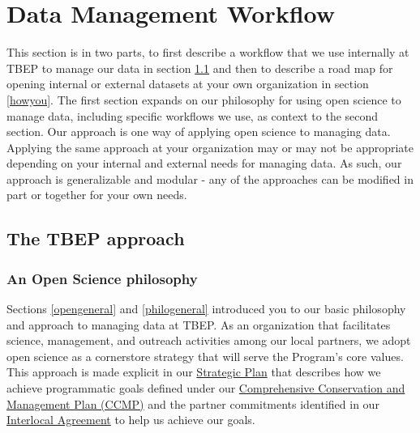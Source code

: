 \documentclass[
]{book}
\begin{document}
\chapter{Data Management Workflow}\label{workflow}

This section is in two parts, to first describe a workflow that we use internally at TBEP to manage our data in section \ref{tbepapproach} and then to describe a road map for opening internal or external datasets at your own organization in section \ref{howyou}. The first section expands on our philosophy for using open science to manage data, including specific workflows we use, as context to the second section. Our approach is one way of applying open science to managing data. Applying the same approach at your organization may or may not be appropriate depending on your internal and external needs for managing data. As such, our approach is generalizable and modular - any of the approaches can be modified in part or together for your own needs.

\section{The TBEP approach}\label{tbepapproach}

\subsection{An Open Science philosophy}\label{philo}

Sections \ref{opengeneral} and \ref{philogeneral} introduced you to our basic philosophy and approach to managing data at TBEP. As an organization that facilitates science, management, and outreach activities among our local partners, we adopt open science as a cornerstore strategy that will serve the Program's core values. This approach is made explicit in our \href{https://drive.google.com/file/d/11xohuoaHDxNHRqgXoOHdI37FpWvac_rn/view?usp=sharing}{Strategic Plan} that describes how we achieve programmatic goals defined under our \href{https://ccmp.tbep.org}{Comprehensive Conservation and Management Plan (CCMP)} and the partner commitments identified in our \href{https://drive.google.com/file/d/1iJcWxmc5SeyDTqiCQ3MLQGWEY_EDGtZT/view?usp=sharing}{Interlocal Agreement} to help us achieve our goals.
\end{document}
